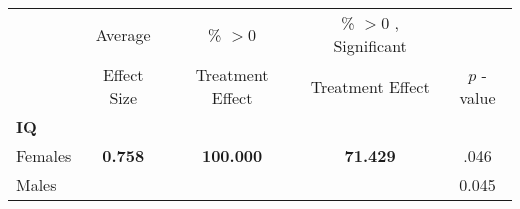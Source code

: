 \begin{tabular}{l c c c c}
\toprule
 & Average & \% $ >0 $ & \% $ >0 $ , Significant & \citet{Rosenbaum_2005_Distribution_JRSS} \\
 & Effect Size & Treatment Effect & Treatment Effect & $ p $ -value \\
\midrule
\textbf{IQ} & & & & \\
\quad Females &  \textbf{    0.758} & \textbf{  100.000} & \textbf{   71.429} & .046 \\
\quad Males &   &  &  &     0.045 \\
\midrule
\bottomrule
\end{tabular}
